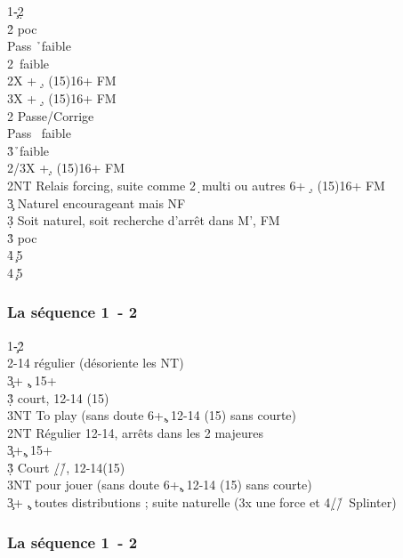\documentclass[a4paper]{article}
\begin{document}
\begin{bidtable}
1\c-2\d\+\\
2\h \> poc\+\\
Pass \h\ faible\\
2\s {}\s\ faible\\
2X + \d , (15)16+ FM\\
3X + \d , (15)16+ FM\-\\
2\s \> Passe/Corrige\+\\
Pass \s\ faible\\
3\h {}\h\ faible\\
2/3X +\d , (15)16+ FM\-\\
2NT \> Relais forcing, suite comme 2\d\ multi ou autres 6+ \d , (15)16+ FM\\
3\c \> Naturel encourageant mais NF\\
3\d \> Soit naturel, soit recherche d'arrêt dans M', FM\\
3\h\s \> poc\\
4\h {}\c\ 5\h \\
4\s {}\c\ 5\s \-
\end{bidtable}

\subsubsection{La séquence 1\pdfc\ - 2\pdfh}

\begin{bidtable}
1\c-2\h\+\\
2\s {}-14 régulier (désoriente les NT)\+\\
3\c {}+ \c , 15+\\
3\d\h\s \> court, 12-14 (15)\\
3NT \> To play (sans doute 6+\c , 12-14 (15) sans courte)\-\\
2NT \> Régulier 12-14, arrêts dans les 2 majeures\+\\
3\c {}+\c , 15+\\
3\d\h\s \> Court \d /\h /\s , 12-14(15)\\
3NT \> pour jouer (sans doute 6+\c , 12-14 (15) sans courte)\-\\
3\c {}+ \c , toutes distributions ; suite naturelle (3x une force et 4\d /\h /\s\ Splinter)\-
\end{bidtable}

\subsubsection{La séquence 1\pdfc\ - 2\pdfs}
\end{document}
